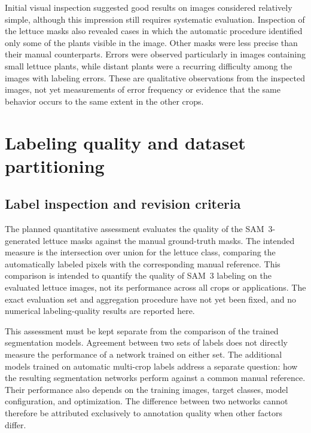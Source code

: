 Initial visual inspection suggested good results on images considered
relatively simple, although this impression still requires systematic
evaluation. Inspection of the lettuce masks also revealed cases in which the
automatic procedure identified only some of the plants visible in the
image. Other masks were less precise than their manual counterparts.
Errors were observed particularly in images containing small lettuce
plants, while distant plants were a recurring difficulty among the
images with labeling errors. These are qualitative observations from
the inspected images, not yet measurements of error frequency or evidence
that the same behavior occurs to the same extent in the other crops.

\section{Labeling quality and dataset partitioning}
\label{sec:c3_quality_splits}

\subsection{Label inspection and revision criteria}
\label{subsec:c3_annotation_quality}

The planned quantitative assessment evaluates the quality of the
SAM~3-generated lettuce masks against the manual ground-truth masks.
The intended measure is the intersection over union for the lettuce
class, comparing the automatically labeled pixels with the corresponding
manual reference. This comparison is intended to quantify the quality
of SAM~3 labeling on the evaluated lettuce images, not its performance
across all crops or applications. The exact evaluation set and aggregation
procedure have not yet been fixed, and no numerical labeling-quality
results are reported here.

This assessment must be kept separate from the comparison of the trained
segmentation models. Agreement between two sets of labels does not
directly measure the performance of a network trained on either set.
The additional models trained on automatic multi-crop labels address a
separate question: how the resulting segmentation networks perform
against a common manual reference. Their performance also depends on
the training images, target classes, model configuration, and optimization.
The difference between two networks cannot therefore be attributed
exclusively to annotation quality when other factors differ.

